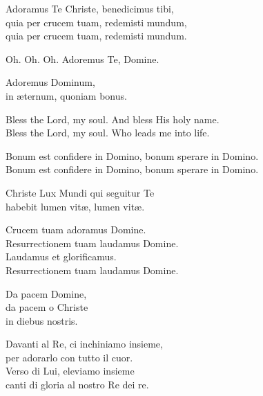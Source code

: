 

Adoramus Te Christe, benedicimus tibi,\\
quia per crucem tuam, redemisti mundum,\\
quia per crucem tuam, redemisti mundum.

\spaziotaize


Oh. Oh. Oh. Adoremus Te, Domine.

\spaziotaize


Adoremus Dominum,\\
in \ae ternum, quoniam bonus.

\spaziotaize


Bless the Lord, my soul. And bless His holy name.\\
Bless the Lord, my soul. Who leads me into life.

\spaziotaize


Bonum est confidere in Domino, bonum sperare in Domino.\\
Bonum est confidere in Domino, bonum sperare in Domino.

\spaziotaize


Christe Lux Mundi qui seguitur Te\\
habebit lumen vit\ae , lumen vit\ae .

\spaziotaize


Crucem tuam adoramus Domine.\\
Resurrectionem tuam laudamus Domine.\\
Laudamus et glorificamus.\\
Resurrectionem tuam laudamus Domine.

\spaziotaize


Da pacem Domine,\\
da pacem o Christe\\
in diebus nostris.

\spaziotaize


Davanti al Re, ci inchiniamo insieme,\\
per adorarlo con tutto il cuor.\\
Verso di Lui, eleviamo insieme\\
canti di gloria al nostro Re dei re.

